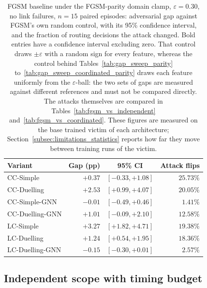 \begin{table}[htbp]
  \centering
  \caption[FGSM baseline under the FGSM-parity clamp: adversarial gap and flip rates]{%
           FGSM baseline under the FGSM-parity domain clamp, $\varepsilon = 0.30$, no
           link failures, $n = 15$ paired episodes: adversarial gap against FGSM's own
           random control, with its 95\% confidence interval, and the fraction of
           routing decisions the attack changed. Bold entries have a confidence interval
           excluding zero. That control draws $\pm\varepsilon$ with a random sign for
           every feature, whereas the control behind
           Tables~\ref{tab:gap_sweep_parity} to~\ref{tab:gap_sweep_coordinated_parity}
           draws each feature uniformly from the $\varepsilon$-ball: the two sets of
           gaps are measured against different references and must not be compared
           directly. The attacks themselves are compared in
           Tables~\ref{tab:fgsm_vs_independent} and~\ref{tab:fgsm_vs_coordinated}.
           These figures are measured on the base trained victim of each
           architecture; Section~\ref{subsec:limitations_statistics} reports how far
           they move between training runs of the victim.}
  \label{tab:fgsm_baseline}
  \begin{tabular}{lrcr}
    \hline
    \textbf{Variant} & \textbf{Gap (pp)} & \textbf{95\% CI} & \textbf{Attack flips} \\
    \hline
    CC-Simple        & $+0.37$ & $[-0.33, +1.08]$ & $25.73\%$ \\
    CC-Duelling      & $\mathbf{+2.53}$ & $[+0.99, +4.07]$ & $20.05\%$ \\
    CC-Simple-GNN    & $-0.01$ & $[-0.49, +0.46]$ & $1.41\%$ \\
    CC-Duelling-GNN  & $+1.01$ & $[-0.09, +2.10]$ & $12.58\%$ \\
    LC-Simple        & $\mathbf{+3.27}$ & $[+1.82, +4.71]$ & $19.38\%$ \\
    LC-Duelling      & $\mathbf{+1.24}$ & $[+0.54, +1.95]$ & $18.36\%$ \\
    LC-Duelling-GNN  & $-0.15$ & $[-0.30, +0.01]$ & $2.57\%$ \\
    \hline
  \end{tabular}
\end{table}

\subsection{Independent scope with timing budget}
\label{subsec:results_fgsm_independent}

